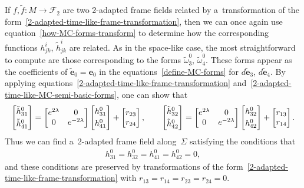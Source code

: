 \documentclass[pdftex]{sigma}
\numberwithin{equation}{section}
\theoremstyle{definition}
\begin{document}
If $f, \tilde{f}:M \to \mathcal{F}_2$ are two 2-adapted frame f\/ields related by a~transformation of the
form~\eqref{2-adapted-time-like-frame-transformation}, then we can once again use equation~\eqref{how-MC-forms-transform}
to determine how the corresponding functions $h^i_{jk}$, $\tilde{h}^i_{jk}$ are related.
As in the space-like case, the most straightforward to compute are those correspon\-ding to the forms $\tilde{\omega}^0_3$, $\tilde{\omega}^0_4$.
These forms appear as the coef\/f\/icients of $\tilde{\mathbf{e}}_0 = \mathbf{e}_0$ in the equations~\eqref{define-MC-forms}
for $d\tilde{\mathbf{e}}_3$, $d\tilde{\mathbf{e}}_4$.
By applying equations~\eqref{2-adapted-time-like-frame-transformation}
and~\eqref{2-adapted-time-like-MC-semi-basic-forms}, one can show that
\begin{gather*}
\begin{bmatrix}
\tilde{h}^0_{31}
\vspace{1mm}\\
\tilde{h}^0_{41}
\end{bmatrix}
=
\begin{bmatrix}
e^{2\lambda} & 0
\\
0 & e^{-2\lambda}
\end{bmatrix}
\begin{bmatrix}
h^0_{31}
\vspace{1mm}\\
h^0_{41}
\end{bmatrix}
+
\begin{bmatrix}
r_{23}
\\
r_{24}
\end{bmatrix},
\qquad
\begin{bmatrix}
\tilde{h}^0_{32}
\vspace{1mm}\\
\tilde{h}^0_{42}
\end{bmatrix}
=
\begin{bmatrix}
e^{2\lambda} & 0
\\
0 & e^{-2\lambda}
\end{bmatrix}
\begin{bmatrix}
h^0_{32}
\vspace{1mm}\\
h^0_{42}
\end{bmatrix}
+
\begin{bmatrix}
r_{13}
\\
r_{14}
\end{bmatrix}.
\end{gather*}
Thus we can f\/ind a~2-adapted frame f\/ield along~$\Sigma$ satisfying the conditions that
\begin{gather*}
h^0_{31} = h^0_{32} = h^0_{41} = h^0_{42} = 0,
\end{gather*}
and these conditions are preserved by transformations of the form~\eqref{2-adapted-time-like-frame-transformation} with
$r_{13} = r_{14} = r_{23} = r_{24} = 0$.
\end{document}
